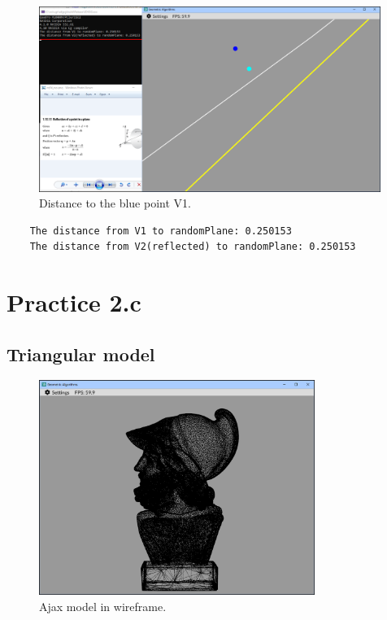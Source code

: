 \documentclass[12pt,a4paper,english]{article}
\begin{document}
\begin{figure}[H]
    \centering
    \includegraphics[width=0.99\textwidth]{p2b-3}
    \caption[]{Distance to the blue point V1.}
    \label{fig:p2b-3}
\end{figure}

\begin{verbatim}
    The distance from V1 to randomPlane: 0.250153
    The distance from V2(reflected) to randomPlane: 0.250153
\end{verbatim}

\newpage

\section{Practice 2.c}
\subsection{Triangular model}

\begin{figure}[H]
    \centering
    \includegraphics[width=0.8\textwidth]{p2c-1}
    \caption[]{Ajax model in wireframe.}
    \label{fig:p2c-1}
\end{figure}
\end{document}
